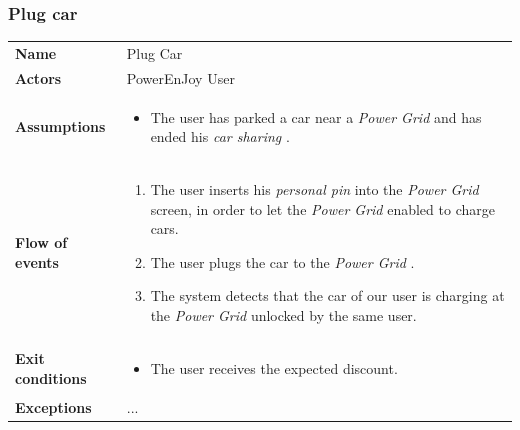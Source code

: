 \documentclass[english]{article}
\newcommand{\carsharing}{\textit {car sharing }}
\newcommand{\powergrid}{\textit{Power Grid }}
\newcommand{\personalpin}{\textit{personal pin }}
\begin{document}
\subsubsection{Plug car}
	\begin{center}
	\begin{tabular}{l||p{10cm}}
	\textbf{Name} 
		& Plug Car\\ [8px]
	\textbf{Actors} 
		& PowerEnJoy User\\ [8px]
	\textbf{Assumptions} 
	& \begin{itemize}
		\item The user has parked a car near a \powergrid and has ended his \carsharing. 
	\end{itemize}\\
	\textbf{Flow of events}
		& \begin{enumerate}
 			\item The user inserts his \personalpin into the \powergrid screen, in order to let the \powergrid enabled to charge cars.
			\item The user plugs the car to the \powergrid.
			\item The system detects that the car of our user is charging at the \powergrid unlocked by the same user. 
		\end{enumerate}\\ 
	\textbf{Exit conditions}
		&\begin{itemize}
			\item The user receives the expected discount.
		\end{itemize}\\
	\textbf{Exceptions}
		&...\\[8px]
	\end{tabular}
	\end{center}
\end{document}
